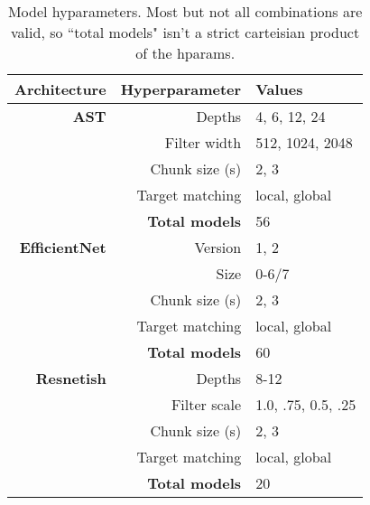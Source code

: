\begin{table}[!t]
\captionsetup{size=footnotesize}
\centering
\caption{Model hyparameters. Most but not all combinations are valid, so ``total models" isn't a strict carteisian product of the hparams.}\label{tab:train_hp}
\footnotesize
\begin{tabular}{r r l } \toprule
  Architecture & Hyperparameter & Values \\
  \midrule
  \textbf{AST} & Depths  & 4, 6, 12, 24 \\
               & Filter width & 512, 1024, 2048 \\
               & Chunk size (s)  & 2, 3 \\
               & Target matching  & local, global \\
               & \textbf{Total models} & 56 \\
  
  \midrule
  \textbf{EfficientNet} & Version & 1, 2 \\
               & Size    & 0-6/7 \\
               & Chunk size (s)  & 2, 3 \\
               & Target matching  & local, global \\
               & \textbf{Total models} & 60 \\
               \midrule
  \textbf{Resnetish} & Depths  & 8-12\\
        & Filter scale  & 1.0, .75, 0.5, .25 \\
        & Chunk size (s)  & 2, 3 \\
        & Target matching  & local, global \\
  & \textbf{Total models} & 20 \\
 \bottomrule
\end{tabular}
\end{table}
